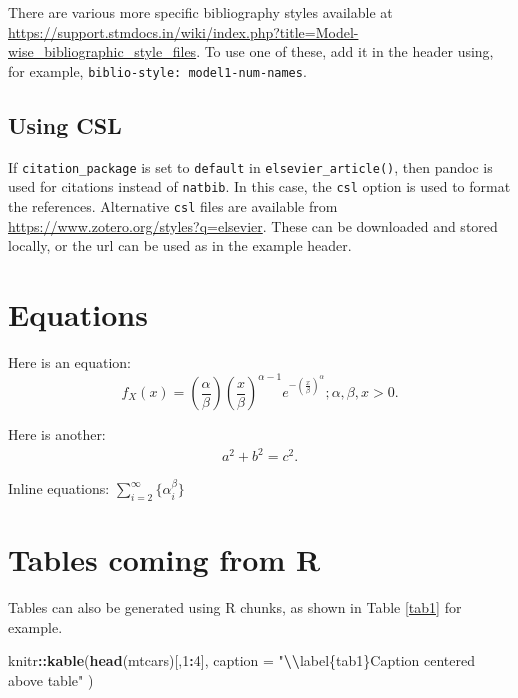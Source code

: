 \documentclass[preprint, 3p,
authoryear]{elsarticle} %
\newenvironment{Shaded}{\begin{snugshade}}{\end{snugshade}}
\newcommand{\AttributeTok}[1]{\textcolor[rgb]{0.13,0.29,0.53}{#1}}
\newcommand{\DecValTok}[1]{\textcolor[rgb]{0.00,0.00,0.81}{#1}}
\newcommand{\FunctionTok}[1]{\textcolor[rgb]{0.13,0.29,0.53}{\textbf{#1}}}
\newcommand{\NormalTok}[1]{#1}
\newcommand{\SpecialCharTok}[1]{\textcolor[rgb]{0.81,0.36,0.00}{\textbf{#1}}}
\newcommand{\StringTok}[1]{\textcolor[rgb]{0.31,0.60,0.02}{#1}}
\begin{document}
There are various more specific bibliography styles available at
\url{https://support.stmdocs.in/wiki/index.php?title=Model-wise_bibliographic_style_files}.
To use one of these, add it in the header using, for example,
\texttt{biblio-style:\ model1-num-names}.

\hypertarget{using-csl}{%
\subsection{Using CSL}\label{using-csl}}

If \texttt{citation\_package} is set to \texttt{default} in
\texttt{elsevier\_article()}, then pandoc is used for citations instead
of \texttt{natbib}. In this case, the \texttt{csl} option is used to
format the references. Alternative \texttt{csl} files are available from
\url{https://www.zotero.org/styles?q=elsevier}. These can be downloaded
and stored locally, or the url can be used as in the example header.

\hypertarget{equations}{%
\section{Equations}\label{equations}}

Here is an equation: \[ 
  f_{X}(x) = \left(\frac{\alpha}{\beta}\right)
  \left(\frac{x}{\beta}\right)^{\alpha-1}
  e^{-\left(\frac{x}{\beta}\right)^{\alpha}}; 
  \alpha,\beta,x > 0 .
\]

Here is another: \begin{align}
  a^2+b^2=c^2.
\end{align}

Inline equations: \(\sum_{i = 2}^\infty\{\alpha_i^\beta\}\)

\hypertarget{tables-coming-from-r}{%
\section{Tables coming from R}\label{tables-coming-from-r}}

Tables can also be generated using R chunks, as shown in Table
\ref{tab1} for example.

\begin{Shaded}
\begin{Highlighting}[]
\NormalTok{knitr}\SpecialCharTok{::}\FunctionTok{kable}\NormalTok{(}\FunctionTok{head}\NormalTok{(mtcars)[,}\DecValTok{1}\SpecialCharTok{:}\DecValTok{4}\NormalTok{], }
    \AttributeTok{caption =} \StringTok{"}\SpecialCharTok{\textbackslash{}\textbackslash{}}\StringTok{label\{tab1\}Caption centered above table"}
\NormalTok{)}
\end{Highlighting}
\end{Shaded}
\end{document}
